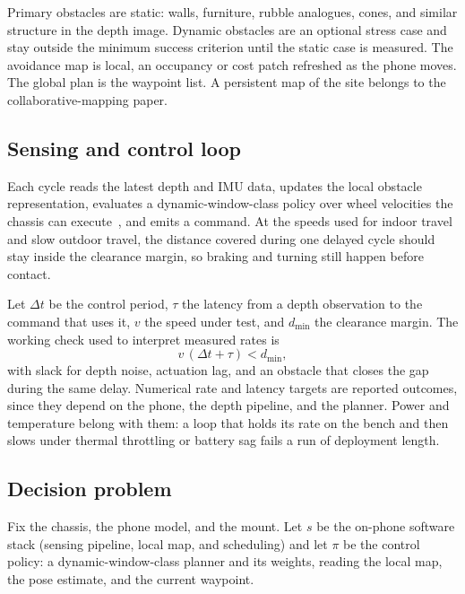 \documentclass[11pt,a4paper]{article}
\begin{document}
Primary obstacles are static: walls, furniture, rubble analogues, cones, and similar structure in the depth image.
Dynamic obstacles are an optional stress case and stay outside the minimum success criterion until the static case is measured.
The avoidance map is local, an occupancy or cost patch refreshed as the phone moves.
The global plan is the waypoint list.
A persistent map of the site belongs to the collaborative-mapping paper.

\subsection{Sensing and control loop}
\label{sec:loop}

Each cycle reads the latest depth and IMU data, updates the local obstacle representation, evaluates a dynamic-window-class policy over wheel velocities the chassis can execute~\citep{fox1997dwa}, and emits a command.
At the speeds used for indoor travel and slow outdoor travel, the distance covered during one delayed cycle should stay inside the clearance margin, so braking and turning still happen before contact.

Let \(\Delta t\) be the control period, \(\tau\) the latency from a depth observation to the command that uses it, \(v\) the speed under test, and \(d_{\min}\) the clearance margin.
The working check used to interpret measured rates is
\begin{equation}
\label{eq:loop-margin}
v \, (\Delta t + \tau) < d_{\min},
\end{equation}
with slack for depth noise, actuation lag, and an obstacle that closes the gap during the same delay.
Numerical rate and latency targets are reported outcomes, since they depend on the phone, the depth pipeline, and the planner.
Power and temperature belong with them: a loop that holds its rate on the bench and then slows under thermal throttling or battery sag fails a run of deployment length.

\subsection{Decision problem}
\label{sec:decision}

Fix the chassis, the phone model, and the mount.
Let \(s\) be the on-phone software stack (sensing pipeline, local map, and scheduling) and let \(\pi\) be the control policy: a dynamic-window-class planner and its weights, reading the local map, the pose estimate, and the current waypoint.
\end{document}
